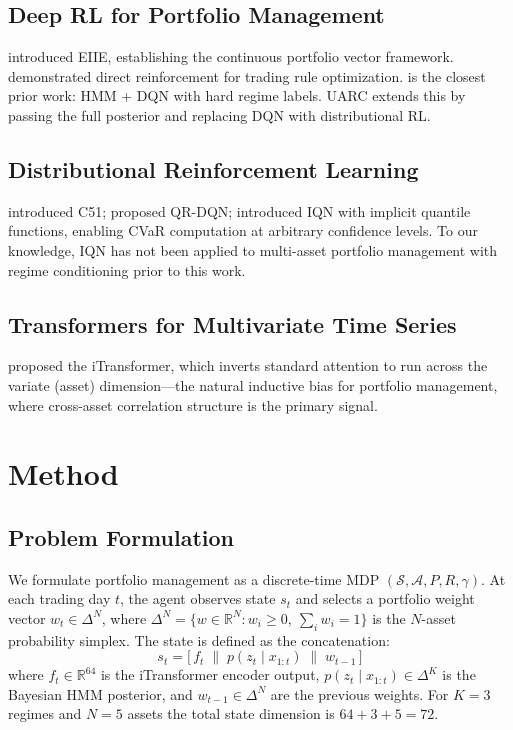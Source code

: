 \documentclass[sigconf,nonacm]{acmart}
\newcommand{\R}{\mathbb{R}}
\newcommand{\Sc}{\mathcal{S}}
\newcommand{\A}{\mathcal{A}}
\newcommand{\st}{s_t}
\newcommand{\wt}{w_t}
\newcommand{\ft}{f_t}
\newcommand{\post}{p(z_t \mid x_{1:t})}
\begin{document}
\subsection{Deep RL for Portfolio Management}
\citet{jiang2017} introduced EIIE, establishing the continuous portfolio vector
framework.
\citet{moody2001} demonstrated direct reinforcement for trading rule optimization.
\citet{almahdi2019} is the closest prior work: HMM + DQN with hard regime
labels. \textsc{UARC} extends this by passing the full posterior and replacing
DQN with distributional RL.

\subsection{Distributional Reinforcement Learning}
\citet{bellemare2017} introduced C51; \citet{dabney2018qr} proposed
QR-DQN; \citet{dabney2018iqn} introduced IQN with implicit quantile
functions, enabling CVaR computation at arbitrary confidence levels.
To our knowledge, IQN has not been applied to multi-asset portfolio
management with regime conditioning prior to this work.

\subsection{Transformers for Multivariate Time Series}
\citet{liu2024itransformer} proposed the iTransformer, which inverts standard
attention to run across the variate (asset) dimension---the natural inductive
bias for portfolio management, where cross-asset correlation structure is the
primary signal.

\section{Method}
\label{sec:method}

\subsection{Problem Formulation}
We formulate portfolio management as a discrete-time MDP
$(\Sc, \A, P, R, \gamma)$.
At each trading day $t$, the agent observes state $\st$ and selects a
portfolio weight vector $\wt \in \Delta^N$, where
$\Delta^N = \{w \in \R^N : w_i \geq 0,\ \sum_i w_i = 1\}$ is the $N$-asset
probability simplex.
The state is defined as the concatenation:
\begin{equation}
  \st = \bigl[\, \ft \;\|\; \post \;\|\; w_{t-1} \,\bigr]
  \label{eq:state}
\end{equation}
where $\ft \in \R^{64}$ is the iTransformer encoder output,
$\post \in \Delta^K$ is the Bayesian HMM posterior, and
$w_{t-1} \in \Delta^N$ are the previous weights.
For $K=3$ regimes and $N=5$ assets the total state dimension is
$64 + 3 + 5 = 72$.
\end{document}
